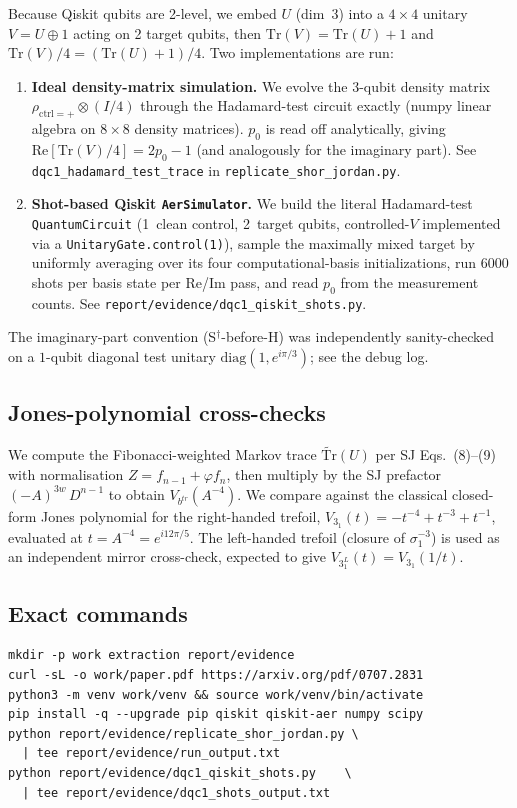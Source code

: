 \documentclass[11pt]{article}
\begin{document}
Because Qiskit qubits are 2-level, we embed $U$ (dim~3) into a $4\times4$
unitary $V=U\oplus 1$ acting on 2 target qubits, then $\mathrm{Tr}(V)=\mathrm{Tr}(U)+1$
and $\mathrm{Tr}(V)/4=(\mathrm{Tr}(U)+1)/4$. Two implementations are run:
\begin{enumerate}
\item[(a)] \textbf{Ideal density-matrix simulation.} We evolve the
$3$-qubit density matrix $\rho_{\mathrm{ctrl}=+}\otimes(I/4)$ through the
Hadamard-test circuit exactly (numpy linear algebra on $8\times8$
density matrices). $p_0$ is read off analytically, giving
$\mathrm{Re}[\mathrm{Tr}(V)/4]=2p_0-1$ (and analogously for the imaginary
part). See \texttt{dqc1\_hadamard\_test\_trace} in
\texttt{replicate\_shor\_jordan.py}.
\item[(b)] \textbf{Shot-based Qiskit \texttt{AerSimulator}.} We build the
literal Hadamard-test \texttt{QuantumCircuit} (1~clean control, 2~target
qubits, controlled-$V$ implemented via a \texttt{UnitaryGate.control(1)}),
sample the maximally mixed target by uniformly averaging over its four
computational-basis initializations, run 6000 shots per basis state per
Re/Im pass, and read $p_0$ from the measurement counts. See
\texttt{report/evidence/dqc1\_qiskit\_shots.py}.
\end{enumerate}
The imaginary-part convention (S$^\dagger$-before-H) was independently
sanity-checked on a $1$-qubit diagonal test unitary
$\mathrm{diag}(1,e^{i\pi/3})$; see the debug log.

\subsection{Jones-polynomial cross-checks}\label{sec:jones}

We compute the Fibonacci-weighted Markov trace $\widetilde{\mathrm{Tr}}(U)$
per SJ Eqs.~(8)--(9) with normalisation $Z=f_{n-1}+\varphi f_n$, then
multiply by the SJ prefactor $(-A)^{3w}\,D^{n-1}$ to obtain
$V_{b^{tr}}(A^{-4})$. We compare against the classical closed-form Jones
polynomial for the right-handed trefoil,
$V_{3_1}(t)=-t^{-4}+t^{-3}+t^{-1}$, evaluated at $t=A^{-4}=e^{i12\pi/5}$.
The left-handed trefoil (closure of $\sigma_1^{-3}$) is used as an
independent mirror cross-check, expected to give $V_{3_1^L}(t)=V_{3_1}(1/t)$.

\subsection{Exact commands}
\begin{lstlisting}
mkdir -p work extraction report/evidence
curl -sL -o work/paper.pdf https://arxiv.org/pdf/0707.2831
python3 -m venv work/venv && source work/venv/bin/activate
pip install -q --upgrade pip qiskit qiskit-aer numpy scipy
python report/evidence/replicate_shor_jordan.py \
  | tee report/evidence/run_output.txt
python report/evidence/dqc1_qiskit_shots.py    \
  | tee report/evidence/dqc1_shots_output.txt
\end{lstlisting}
\end{document}
